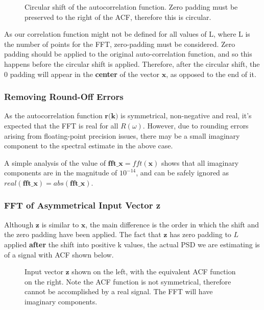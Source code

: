 \documentclass[main.tex]{subfiles}
\begin{document}
\begin{figure}[H]
	\centering 
	\resizebox{0.8\textwidth}{!}{}
	\caption{Circular shift of the autocorrelation function. Zero padding must be preserved to the right of the ACF, therefore this is circular.}
	\label{fig:q1_2_a-shift}
\end{figure}

As our correlation function might not be defined for all values of L, where L is the number of points for the FFT, zero-padding must be considered. Zero padding should be applied to the original auto-correlation function, and so this happens before the circular shift is applied. Therefore, after the circular shift, the 0 padding will appear in the \textbf{center} of the vector $\textbf{x}$, as opposed to the end of it.


\subsubsection{Removing Round-Off Errors}

As the autocorrelation function $\textbf{r(k)}$ is symmetrical, non-negative and real, it's expected that the FFT is real for all $R(\omega)$. However, due to rounding errors arising from floating-point precision issues, there may be a small imaginary component to the spectral estimate in the above case. 

A simple analysis of the value of $\textbf{fft\_x} = fft(\textbf{x})$ shows that all imaginary components are in the magnitude of $10^{-14}$, and can be safely ignored as $real(\textbf{fft\_x}) = abs(\textbf{fft\_x})$. 



\subsubsection{FFT of Asymmetrical Input Vector z}

Although $\textbf{z}$ is similar to $\textbf{x}$, the main difference is the order in which the shift and the zero padding have been applied. The fact that $\textbf{z}$ has zero padding  to $L$ applied \textbf{after} the shift into positive k values, the actual PSD we are estimating is of a signal with ACF shown below.

\begin{figure}[H]
	\centering 
	\resizebox{0.8\textwidth}{!}{}
	\caption{Input vector $\textbf{z}$ shown on the left, with the equivalent ACF function on the right. Note the ACF function is not symmetrical, therefore cannot be accomplished by a real signal. The FFT will have imaginary components.}
	\label{fig:q1_2_c}
\end{figure}
\end{document}
